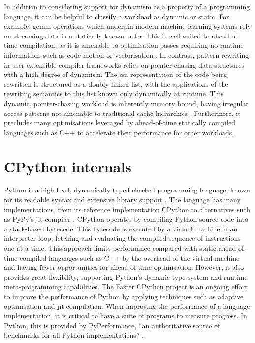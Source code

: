 In addition to considering support for dynamism as a property of a programming language, it can be helpful to classify a workload as dynamic or static.
For example, \ac{gemm} operations which underpin modern machine learning systems rely on streaming data in a statically known order. This is well-suited to ahead-of-time compilation, as it is amenable to optimisation passes requiring no runtime information, such as code motion or vectorisation \cite{emerybergerPythonPerformanceMatters2022}.
In contrast, pattern rewriting in user-extensible compiler frameworks relies on pointer chasing data structures with a high degree of dynamism. The \ac{ssa} representation of the code being rewritten is structured as a doubly linked list, with the applications of the rewriting semantics to this list known only dynamically at runtime.
This dynamic, pointer-chasing workload is inherently memory bound, having irregular access patterns not amenable to traditional cache hierarchies \cite{wangEvaluatingSynchronizationOverhead2025}. Furthermore, it precludes many optimisations leveraged by ahead-of-time statically compiled languages such as C++ to accelerate their performance for other workloads.



\section{CPython internals}
\label{sec:python-internals}

Python is a high-level, dynamically typed-checked programming language, known for its readable syntax and extensive library support \cite{guidovanrossumPythonCpython2025}.
The language has many implementations, from its reference implementation CPython to alternatives such as PyPy's \ac{jit} compiler \cite{thepypyteamPypyPypy2025}.
CPython operates by compiling Python source code into a stack-based bytecode. This bytecode is executed by a virtual machine in an interpreter loop, fetching and evaluating the compiled sequence of instructions one at a time. This approach limits performance compared with static ahead-of-time compiled languages such as C++ by the overhead of the virtual machine and having fewer opportunities for ahead-of-time optimisation. However, it also provides great flexibility, supporting Python's dynamic type system and runtime meta-programming capabilities.
The Faster CPython project is an ongoing effort to improve the performance of Python by applying techniques such as adaptive optimisation and \ac{jit} compilation.
When improving the performance of a language implementation, it is critical to have a suite of programs to measure progress. In Python, this is provided by PyPerformance, ``an authoritative source of benchmarks for all Python implementations'' \cite{collinwinterPythonPyperformance2025}.



